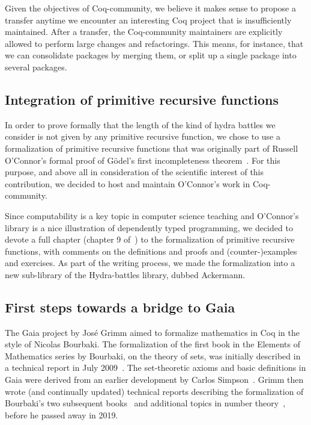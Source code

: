 \documentclass{easychair}
\newcommand{\coq}{Coq\xspace}
\newcommand{\community}{Coq-community\xspace}
\newcommand{\gaia}{Gaia\xspace}
\begin{document}
Given the objectives of \community, we believe it makes sense to propose a transfer anytime we encounter an interesting Coq project that is insufficiently maintained.
%
After a transfer, the \community maintainers are explicitly allowed to perform large changes and refactorings.
%
This means, for instance, that we can consolidate packages by merging them, or split up a single package into several packages.

\subsection{Integration of primitive recursive functions}

In order to prove formally that the length of the
kind of hydra battles we consider is not given by any primitive recursive function, we chose to use a formalization of primitive recursive functions that was originally part of Russell O'Connor's formal proof of G\"{o}del's first incompleteness theorem~\cite{OConnor05, Goedel}.
For this purpose, and above all in consideration of the scientific interest of this contribution, we decided to host and maintain O'Connor's work in \community.

Since computability is a key topic in computer science teaching and O'Connor's library is a nice illustration of dependently typed programming, we decided to devote a full chapter (chapter 9 of~\cite{HydraBook}) to the formalization of primitive recursive functions, with comments on the definitions and proofs and (counter-)examples and exercises. As part of the writing process, we made the formalization into a new sub-library of the Hydra-battles library, dubbed Ackermann.

\subsection{First steps towards a bridge to \gaia}

The \gaia project by Jos\'e Grimm aimed to formalize mathematics in \coq in the style of Nicolas Bourbaki. The formalization of the first book in the Elements of Mathematics series by Bourbaki, on the theory of sets, was initially described in a technical report in July 2009~\cite{Grimm2009a}. The set-theoretic axioms and basic definitions in \gaia were derived from an earlier development by Carlos Simpson~\cite{Simpson2004,CatsZFCContrib}. Grimm then wrote (and continually updated) technical reports describing the formalization of Bourbaki's two subsequent books~\cite{Grimm2009b,Grimm2016} and additional topics in number theory~\cite{grimm:hal-00911710,Grimm2014}, before he passed away in 2019.
\end{document}
